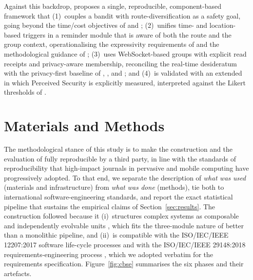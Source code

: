 \documentclass[a4paper,fleqn]{cas-sc}
\begin{document}
	Against this backdrop, \RUTAI{} proposes a single, reproducible, component-based framework that (1)~couples a \UCB{} bandit \citep{bouneffouf2020mabsurvey,zeng2016mab} with route-diversification as a safety goal, going beyond the time/cost objectives of \citet{campigotto2017favour} and \citet{guo2021online}; (2)~unifies time- and location-based triggers in a reminder module that is aware of both the route and the group context, operationalising the expressivity requirements of \citet{wang2015beyond} and the methodological guidance of \citet{shevchenko2024geofencing}; (3)~uses WebSocket-based groups with explicit read receipts and privacy-aware membership, reconciling the real-time desideratum with the privacy-first baseline of \citet{li2017locsharing}, \citet{mckenzie2022privyto}, and \citet{shokri2014mobicrowd}; and (4)~is validated with an extended \TAM{} \citep{davis1989tam} in which Perceived Security is explicitly measured, interpreted against the Likert thresholds of \citet{lindner2024likert}.
	
	\section{Materials and Methods}\label{sec:method}
	
	The methodological stance of this study is to make the construction and the evaluation of \RUTAI{} fully reproducible by a third party, in line with the standards of reproducibility that high-impact journals in pervasive and mobile computing have progressively adopted. To that end, we separate the description of \emph{what was used} (materials and infrastructure) from \emph{what was done} (methods), tie both to international software-engineering standards, and report the exact statistical pipeline that sustains the empirical claims of Section~\ref{sec:results}. The construction followed \CBSE{} because it (i)~structures complex systems as composable and independently evolvable units \citep{khan2022cbse,coullon2024cbse}, which fits the three-module nature of \RUTAI{} better than a monolithic pipeline, and (ii)~is compatible with the ISO/IEC/IEEE 12207:2017 software life-cycle processes \citep{iso12207} and with the ISO/IEC/IEEE 29148:2018 requirements-engineering process \citep{iso29148}, which we adopted verbatim for the requirements specification. Figure~\ref{fig:cbse} summarises the six phases and their artefacts.
	
\end{document}
